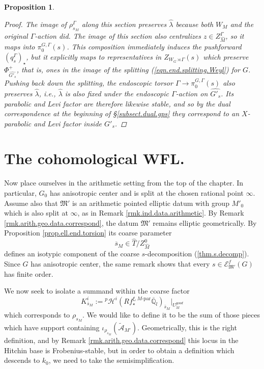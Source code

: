 \documentclass[openany]{amsbook}
\newtheorem{proposition}[theorem]{Proposition}
\theoremstyle{definition}
\theoremstyle{remark}
\numberwithin{equation}{section}
\newcommand{\Q}{\mathbb{Q}}
\newcommand{\cA}{\mathcal{A}}
\newcommand{\cE}{\mathcal{E}}
\newcommand{\ol}[1]{\overline{#1}}
\renewcommand{\-}{\operatorname{-}}
\newcommand{\pHi}{{}^p \mathcal{H}^i}
\newcommand{\good}{\mathit{good}}
\newcommand{\ctA}{\widetilde{\cA}}
\newcommand{\fM}{\mathfrak{M}}
\newcommand{\Mpar}{M\text{-par}}
\begin{document}
\begin{proposition}
\begin{proof}
        The image of $\rho_{s_M}^\Gamma$ along this section preserves $\widehat{\lambda}$ because both $W_M$ and the original $\Gamma$-action did. The image of this section also centralizes $z \in Z_{\widehat{M}}^\Gamma$, so it maps into $\pi_0^{G, \Gamma}(s)$. This composition immediately induces the pushforward $(q_s^\Gamma)_\star$, but it explicitly maps to representatives in $Z_{W_G \rtimes \Gamma}(s)$ which preserve $\Phi_{\widehat{G'_s}}^+$, that is, ones in the image of the splitting (\ref{eqn.end.splitting.Weyl}) for $G$. Pushing back down the splitting, the endoscopic torsor $\Gamma \to \pi_{0}^{G,\Gamma}(s)$ also preserves $\widehat{\lambda}$, i.e., $\widehat{\lambda}$ is also fixed under the endoscopic $\Gamma$-action on $\widehat{G'_s}$. Its parabolic and Levi factor are therefore likewise stable, and 
        so by the dual correspondence at the beginning of \S \ref{subsect.dual.gps} they correspond to an $X$-parabolic and Levi factor inside $G'_s$.
    \end{proof}
\end{proposition}


\section{The cohomological WFL.}\label{subsect.coh.wfl}

Now place ourselves in the arithmetic setting from the top of the chapter. In particular, $G_0$ has anisotropic center and is split at the chosen rational point $\infty$. Assume also that $\fM'$ is an arithmetic pointed elliptic datum with group $M'_0$ which is also split at $\infty$, as in Remark \ref{rmk.ind.data.arithmetic}. By Remark \ref{rmk.arith.geo.data.correspond}, the datum $\fM'$ remains elliptic geometrically. By Proposition \ref{prop.ell.end.torsion} its coarse parameter 
$$
    \ol{s}_M \in \widehat{T}/Z_{\widehat{M}}^0
$$
defines an isotypic component of the coarse $s$-decomposition (\ref{thm.s.decomp}). Since $G$ has anisotropic center, the same remark shows that every $s \in \cE_{\fM'}^f(G)$ has finite order. 

We now seek to isolate a summand within the coarse factor $$K_{\ol{s}_M}^i := \pHi(Rf_\star^{\xi, \Mpar} \ol{\Q}_l)_{\ol{s}_M}|_{U^{\good}_M}$$ which corresponds to $\rho_{s_M}$. We would like to define it to be the sum of those pieces which have support containing $\iota_{\rho_{s_M}}(\ctA_{M'})$. Geometrically, this is the right definition, and by Remark \ref{rmk.arith.geo.data.correspond} this locus in the Hitchin base is Frobenius-stable, but in order to obtain a definition which descends to $k_0$, we need to take the semisimplification. 
\end{document}
